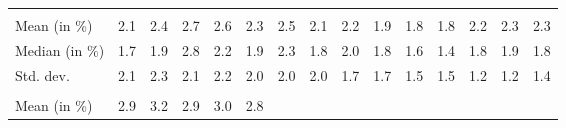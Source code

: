 \begin{tabular}{lllllllllllllll}
  \multicolumn{1}{r}{} &
  \multicolumn{1}{r}{} &
  \multicolumn{1}{r}{} &
  \multicolumn{1}{r}{} &
  \multicolumn{1}{r}{} &
  \multicolumn{1}{r}{} &
  \multicolumn{1}{r}{} &
  \multicolumn{1}{r}{} &
  \multicolumn{1}{r}{} &
  \multicolumn{1}{r}{} \\
\multicolumn{1}{l}{\hspace{2em}Mean (in $\%$)} &
  \multicolumn{1}{|r}{2.1} &
  \multicolumn{1}{r}{2.4} &
  \multicolumn{1}{r}{2.7} &
  \multicolumn{1}{r}{2.6} &
  \multicolumn{1}{r}{2.3} &
  \multicolumn{1}{r}{2.5} &
  \multicolumn{1}{r}{2.1} &
  \multicolumn{1}{r}{2.2} &
  \multicolumn{1}{r}{1.9} &
  \multicolumn{1}{r}{1.8} &
  \multicolumn{1}{r}{1.8} &
  \multicolumn{1}{r}{2.2} &
  \multicolumn{1}{r}{2.3} &
  \multicolumn{1}{r}{2.3} \\
\multicolumn{1}{l}{\hspace{2em}Median (in $\%$)} &
  \multicolumn{1}{|r}{1.7} &
  \multicolumn{1}{r}{1.9} &
  \multicolumn{1}{r}{2.8} &
  \multicolumn{1}{r}{2.2} &
  \multicolumn{1}{r}{1.9} &
  \multicolumn{1}{r}{2.3} &
  \multicolumn{1}{r}{1.8} &
  \multicolumn{1}{r}{2.0} &
  \multicolumn{1}{r}{1.8} &
  \multicolumn{1}{r}{1.6} &
  \multicolumn{1}{r}{1.4} &
  \multicolumn{1}{r}{1.8} &
  \multicolumn{1}{r}{1.9} &
  \multicolumn{1}{r}{1.8} \\
\multicolumn{1}{l}{\hspace{2em}Std. dev.} &
  \multicolumn{1}{|r}{2.1} &
  \multicolumn{1}{r}{2.3} &
  \multicolumn{1}{r}{2.1} &
  \multicolumn{1}{r}{2.2} &
  \multicolumn{1}{r}{2.0} &
  \multicolumn{1}{r}{2.0} &
  \multicolumn{1}{r}{2.0} &
  \multicolumn{1}{r}{1.7} &
  \multicolumn{1}{r}{1.7} &
  \multicolumn{1}{r}{1.5} &
  \multicolumn{1}{r}{1.5} &
  \multicolumn{1}{r}{1.2} &
  \multicolumn{1}{r}{1.2} &
  \multicolumn{1}{r}{1.4} \\
\multicolumn{1}{l}{\hspace{1em}{\textit{Additive term} ($\widehat{t}/\widetilde{p}$)}} &
  \multicolumn{1}{|r}{} &
  \multicolumn{1}{r}{} &
  \multicolumn{1}{r}{} &
  \multicolumn{1}{r}{} &
  \multicolumn{1}{r}{} &
  \multicolumn{1}{r}{} &
  \multicolumn{1}{r}{} &
  \multicolumn{1}{r}{} &
  \multicolumn{1}{r}{} &
  \multicolumn{1}{r}{} &
  \multicolumn{1}{r}{} &
  \multicolumn{1}{r}{} &
  \multicolumn{1}{r}{} &
  \multicolumn{1}{r}{} \\
\multicolumn{1}{l}{\hspace{2em}Mean (in $\%$)} &
  \multicolumn{1}{|r}{2.9} &
  \multicolumn{1}{r}{3.2} &
  \multicolumn{1}{r}{2.9} &
  \multicolumn{1}{r}{3.0} &
  \multicolumn{1}{r}{2.8} &

\end{tabular}
